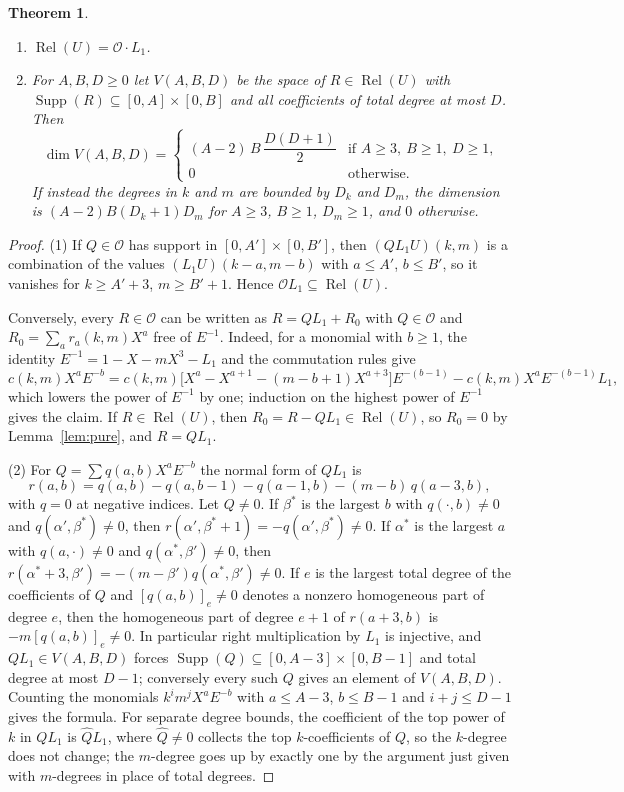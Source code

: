 \documentclass[11pt]{amsart}
\newtheorem{theorem}{Theorem}[section]
\theoremstyle{definition}
\newcommand{\cO}{\mathcal{O}}
\DeclareMathOperator{\Rel}{Rel}
\DeclareMathOperator{\Supp}{Supp}
\begin{document}
\begin{theorem}\label{thm:ideal}\leavevmode
\begin{enumerate}
\item $\Rel(U)=\cO\cdot L_1$.
\item For $A,B,D\ge0$ let $V(A,B,D)$ be the space of $R\in\Rel(U)$ with $\Supp(R)\subseteq[0,A]\times[0,B]$ and all coefficients of total degree at most $D$. Then
\[
  \dim V(A,B,D)=\begin{cases}(A-2)\,B\,\dfrac{D(D+1)}{2}&\text{if }A\ge3,\ B\ge1,\ D\ge1,\\[1ex] 0&\text{otherwise.}\end{cases}
\]
If instead the degrees in $k$ and $m$ are bounded by $D_k$ and $D_m$, the dimension is $(A-2)B(D_k+1)D_m$ for $A\ge3$, $B\ge1$, $D_m\ge1$, and $0$ otherwise.
\end{enumerate}
\end{theorem}

\begin{proof}
(1) If $Q\in\cO$ has support in $[0,A']\times[0,B']$, then $(QL_1U)(k,m)$ is a combination of the values $(L_1U)(k-a,m-b)$ with $a\le A'$, $b\le B'$, so it vanishes for $k\ge A'+3$, $m\ge B'+1$. Hence $\cO L_1\subseteq\Rel(U)$.

Conversely, every $R\in\cO$ can be written as $R=QL_1+R_0$ with $Q\in\cO$ and $R_0=\sum_ar_a(k,m)X^a$ free of $E^{-1}$. Indeed, for a monomial with $b\ge1$, the identity $E^{-1}=1-X-mX^3-L_1$ and the commutation rules give
\[
  c(k,m)X^aE^{-b}=c(k,m)\bigl[X^a-X^{a+1}-(m-b+1)X^{a+3}\bigr]E^{-(b-1)}-c(k,m)X^aE^{-(b-1)}L_1,
\]
which lowers the power of $E^{-1}$ by one; induction on the highest power of $E^{-1}$ gives the claim. If $R\in\Rel(U)$, then $R_0=R-QL_1\in\Rel(U)$, so $R_0=0$ by Lemma~\ref{lem:pure}, and $R=QL_1$.

(2) For $Q=\sum q(a,b)X^aE^{-b}$ the normal form of $QL_1$ is
\begin{equation}\label{eq:rightmult}
  r(a,b)=q(a,b)-q(a,b-1)-q(a-1,b)-(m-b)\,q(a-3,b),
\end{equation}
with $q=0$ at negative indices. Let $Q\ne0$. If $\beta^*$ is the largest $b$ with $q(\cdot,b)\ne0$ and $q(\alpha',\beta^*)\ne0$, then $r(\alpha',\beta^*+1)=-q(\alpha',\beta^*)\ne0$. If $\alpha^*$ is the largest $a$ with $q(a,\cdot)\ne0$ and $q(\alpha^*,\beta')\ne0$, then $r(\alpha^*+3,\beta')=-(m-\beta')q(\alpha^*,\beta')\ne0$. If $e$ is the largest total degree of the coefficients of $Q$ and $[q(a,b)]_e\ne0$ denotes a nonzero homogeneous part of degree $e$, then the homogeneous part of degree $e+1$ of $r(a+3,b)$ is $-m[q(a,b)]_e\ne0$. In particular right multiplication by $L_1$ is injective, and $QL_1\in V(A,B,D)$ forces $\Supp(Q)\subseteq[0,A-3]\times[0,B-1]$ and total degree at most $D-1$; conversely every such $Q$ gives an element of $V(A,B,D)$. Counting the monomials $k^im^jX^aE^{-b}$ with $a\le A-3$, $b\le B-1$ and $i+j\le D-1$ gives the formula. For separate degree bounds, the coefficient of the top power of $k$ in $QL_1$ is $\hat QL_1$, where $\hat Q\ne0$ collects the top $k$-coefficients of $Q$, so the $k$-degree does not change; the $m$-degree goes up by exactly one by the argument just given with $m$-degrees in place of total degrees.
\end{proof}
\end{document}
